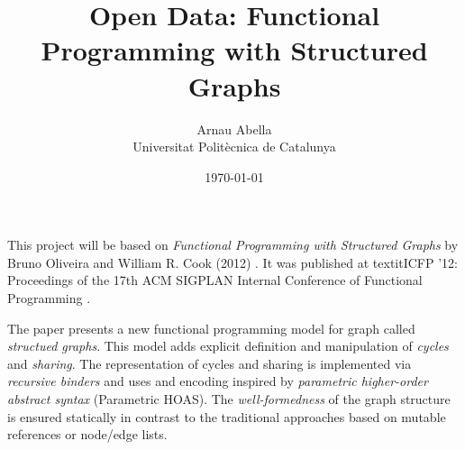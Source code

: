 \documentclass[12pt, a4paper]{article}
\title{%
  \vspace{-10ex}
  Open Data: Functional Programming with Structured Graphs
}
\author{%
  Arnau Abella \\
  \large{Universitat Polit\`ecnica de Catalunya}
}
\date{\today}
\begin{document}
\maketitle

This project will be based on \textit{Functional Programming with Structured Graphs} by Bruno Oliveira and William R. Cook (2012) \cite{oliveira2012functional} .
It was published at textit{ICFP '12: Proceedings of the 17th ACM SIGPLAN Internal Conference of Functional Programming} \cite{icfp12}.

The paper presents a new functional programming model for graph called \textit{structued graphs}.
This model adds explicit definition and manipulation of \textit{cycles} and \textit{sharing}.
The representation of cycles and sharing is implemented via \textit{recursive binders} and uses
and encoding inspired by \textit{parametric higher-order abstract syntax} (Parametric HOAS).
The \textit{well-formedness} of the graph structure is ensured statically in contrast to the traditional
approaches based on mutable references or node/edge lists.











\end{document}
